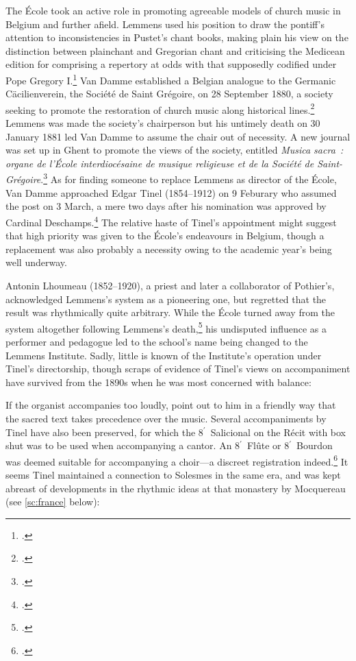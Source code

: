 The École took an active role in promoting agreeable models of church music in Belgium and further afield.
Lemmens used his position to draw the pontiff's attention to inconsistencies in Pustet's chant books, making plain his view on the distinction between plainchant and Gregorian chant and criticising the Medicean edition for comprising a repertory at odds with that supposedly codified under Pope Gregory I.\footcite[14--15, 17--18]{RobijnsJaakNikolaasLemmens1981}
Van Damme established a Belgian analogue to the Germanic Cäcilienverein, the Société de Saint Grégoire, on 28 September 1880, a society seeking to promote the restoration of church music along historical lines.\footcite[490]{GrijpEenmuziekgeschiedenisNederlanden2001}
Lemmens was made the society's chairperson but his untimely death on 30 January 1881 led Van Damme to assume the chair out of necessity.
A new journal was set up in Ghent to promote the views of the society, entitled \emph{Musica sacra~: organe de l'\'{E}cole interdioc\'{e}saine de musique religieuse et de la Soci\'{e}t\'{e} de Saint-Gr\'{e}goire}.\footcite[98]{LorenzoChanoineVanDamme1898}
As for finding someone to replace Lemmens as director of the École, Van Damme approached Edgar Tinel (1854--1912) on 9 Feburary who assumed the post on 3 March, a mere two days after his nomination was approved by Cardinal Deschamps.\footcite[189--90]{TinelEdgarTinelrecit1923}
The relative haste of Tinel's appointment might suggest that high priority was given to the École's endeavours in Belgium, though a replacement was also probably a necessity owing to the academic year's being well underway.

Antonin Lhoumeau (1852--1920), a priest and later a collaborator of Pothier's, acknowledged Lemmens's system as a pioneering one, but regretted that the result was rhythmically quite arbitrary.
While the École turned away from the system altogether following Lemmens's death,\footcite[279]{LhoumeauRhythmeexecutionaccompagnement1892} his undisputed influence as a performer and pedagogue led to the school's name being changed to the Lemmens Institute.
%
%
Sadly, little is known of the Institute's operation under Tinel's directorship, though scraps of evidence of Tinel's views on accompaniment have survived from the 1890s when he was most concerned with balance:

  {\cite[49]{Tinelchantgregorientheorie1895}}
{If the organist accompanies too loudly, point out to him in a friendly way that the sacred text takes precedence over the music.}
\noindent
Several accompaniments by Tinel have also been preserved, for which the 8$^\prime$~Salicional on the Récit with box shut was to be used when accompanying a cantor.
An 8$^\prime$~Flûte or 8$^\prime$~Bourdon was deemed suitable for accompanying a choir---a discreet registration indeed.\footcite[4:1]{Melodieschantgregorien1892}
It seems Tinel maintained a connection to Solesmes in the same era, and was kept abreast of developments in the rhythmic ideas at that monastery by Mocquereau (see \cref{sc:france} below):

